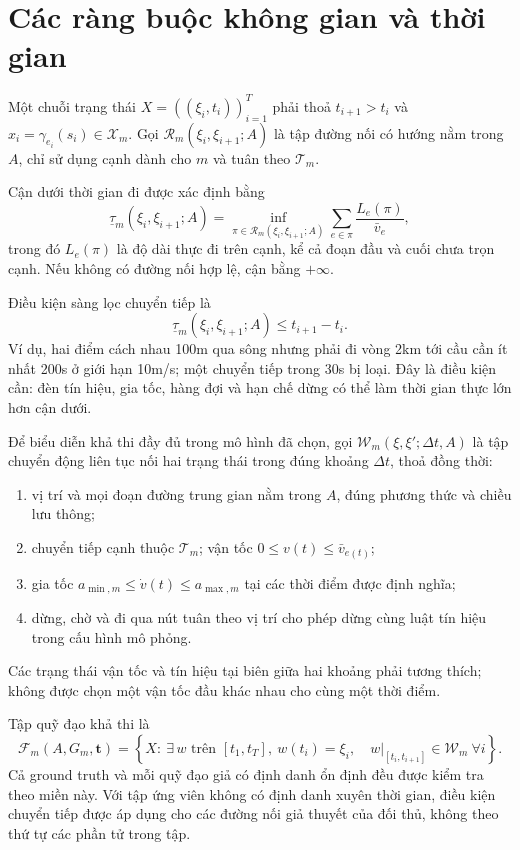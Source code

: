 \documentclass[12pt,a4paper,oneside]{report}
\begin{document}
\section{Các ràng buộc không gian và thời gian}

Một chuỗi trạng thái $X=((\xi_i,t_i))_{i=1}^{T}$ phải thoả $t_{i+1}>t_i$ và $x_i=\gamma_{e_i}(s_i)\in\mathcal X_m$. Gọi $\mathcal R_m(\xi_i,\xi_{i+1};A)$ là tập đường nối có hướng nằm trong $A$, chỉ sử dụng cạnh dành cho $m$ và tuân theo $\mathcal T_m$.

Cận dưới thời gian đi được xác định bằng
\begin{equation}
\underline\tau_m(\xi_i,\xi_{i+1};A)
=\inf_{\pi\in\mathcal R_m(\xi_i,\xi_{i+1};A)}
\sum_{e\in\pi}\frac{L_e(\pi)}{\bar v_e},
\label{eq:minimum-travel-time}
\end{equation}
trong đó $L_e(\pi)$ là độ dài thực đi trên cạnh, kể cả đoạn đầu và cuối chưa trọn cạnh. Nếu không có đường nối hợp lệ, cận bằng $+\infty$.

Điều kiện sàng lọc chuyển tiếp là
\begin{equation}
\underline\tau_m(\xi_i,\xi_{i+1};A)\le t_{i+1}-t_i.
\label{eq:urban-transition}
\end{equation}
Ví dụ, hai điểm cách nhau 100m qua sông nhưng phải đi vòng 2km tới cầu cần ít nhất 200s ở giới hạn 10m/s; một chuyển tiếp trong 30s bị loại. Đây là điều kiện cần: đèn tín hiệu, gia tốc, hàng đợi và hạn chế dừng có thể làm thời gian thực lớn hơn cận dưới.

Để biểu diễn khả thi đầy đủ trong mô hình đã chọn, gọi $\mathcal W_m(\xi,\xi';\Delta t,A)$ là tập chuyển động liên tục nối hai trạng thái trong đúng khoảng $\Delta t$, thoả đồng thời:
\begin{enumerate}
  \item vị trí và mọi đoạn đường trung gian nằm trong $A$, đúng phương thức và chiều lưu thông;
  \item chuyển tiếp cạnh thuộc $\mathcal T_m$; vận tốc $0\le v(t)\le\bar v_{e(t)}$;
  \item gia tốc $a_{\min,m}\le\dot v(t)\le a_{\max,m}$ tại các thời điểm được định nghĩa;
  \item dừng, chờ và đi qua nút tuân theo vị trí cho phép dừng cùng luật tín hiệu trong cấu hình mô phỏng.
\end{enumerate}
Các trạng thái vận tốc và tín hiệu tại biên giữa hai khoảng phải tương thích; không được chọn một vận tốc đầu khác nhau cho cùng một thời điểm.

Tập quỹ đạo khả thi là
\begin{equation}
\mathcal F_m(A,G_m,\mathbf t)
=\left\{X:\ \exists\,w\text{ trên }[t_1,t_T],\
w(t_i)=\xi_i,\quad
w|_{[t_i,t_{i+1}]}\in\mathcal W_m\ \forall i\right\}.
\label{eq:urban-feasible}
\end{equation}
Cả ground truth và mỗi quỹ đạo giả có định danh ổn định đều được kiểm tra theo miền này. Với tập ứng viên không có định danh xuyên thời gian, điều kiện chuyển tiếp được áp dụng cho các đường nối giả thuyết của đối thủ, không theo thứ tự các phần tử trong tập.
\end{document}
